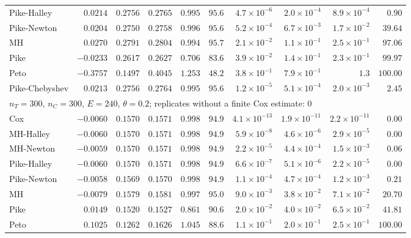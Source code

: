 \begin{landscape}
\begin{longtable}{lrrrrrrrrr}
Pike-Halley & $0.0214$ & $0.2756$ & $0.2765$ & $0.995$ & $95.6$ & $4.7 \times 10^{-6}$ & $2.0 \times 10^{-4}$ & $8.9 \times 10^{-4}$ & $0.90$ \\
Pike-Newton & $0.0204$ & $0.2750$ & $0.2758$ & $0.996$ & $95.6$ & $5.2 \times 10^{-4}$ & $6.7 \times 10^{-3}$ & $1.7 \times 10^{-2}$ & $39.64$ \\
MH & $0.0270$ & $0.2791$ & $0.2804$ & $0.994$ & $95.7$ & $2.1 \times 10^{-2}$ & $1.1 \times 10^{-1}$ & $2.5 \times 10^{-1}$ & $97.06$ \\
Pike & $-0.0233$ & $0.2617$ & $0.2627$ & $0.706$ & $83.6$ & $3.9 \times 10^{-2}$ & $1.4 \times 10^{-1}$ & $2.3 \times 10^{-1}$ & $99.97$ \\
Peto & $-0.3757$ & $0.1497$ & $0.4045$ & $1.253$ & $48.2$ & $3.8 \times 10^{-1}$ & $7.9 \times 10^{-1}$ & $1.3$ & $100.00$ \\
Pike-Chebyshev & $0.0213$ & $0.2756$ & $0.2764$ & $0.995$ & $95.6$ & $1.2 \times 10^{-5}$ & $5.1 \times 10^{-4}$ & $2.0 \times 10^{-3}$ & $2.45$ \\
\multicolumn{10}{l}{$n_T = 300$, $n_C = 300$, $E = 240$, $\theta = 0.2$; replicates without a finite Cox estimate: 0} \\
Cox & $-0.0060$ & $0.1570$ & $0.1571$ & $0.998$ & $94.9$ & $4.1 \times 10^{-13}$ & $1.9 \times 10^{-11}$ & $2.2 \times 10^{-11}$ & $0.00$ \\
MH-Halley & $-0.0060$ & $0.1570$ & $0.1571$ & $0.998$ & $94.9$ & $5.9 \times 10^{-8}$ & $4.6 \times 10^{-6}$ & $2.9 \times 10^{-5}$ & $0.00$ \\
MH-Newton & $-0.0059$ & $0.1570$ & $0.1571$ & $0.998$ & $94.9$ & $2.2 \times 10^{-5}$ & $4.4 \times 10^{-4}$ & $1.5 \times 10^{-3}$ & $0.06$ \\
Pike-Halley & $-0.0060$ & $0.1570$ & $0.1571$ & $0.998$ & $94.9$ & $6.6 \times 10^{-7}$ & $5.1 \times 10^{-6}$ & $2.2 \times 10^{-5}$ & $0.00$ \\
Pike-Newton & $-0.0058$ & $0.1569$ & $0.1570$ & $0.998$ & $94.9$ & $1.1 \times 10^{-4}$ & $4.7 \times 10^{-4}$ & $1.2 \times 10^{-3}$ & $0.21$ \\
MH & $-0.0079$ & $0.1579$ & $0.1581$ & $0.997$ & $95.0$ & $9.0 \times 10^{-3}$ & $3.8 \times 10^{-2}$ & $7.1 \times 10^{-2}$ & $20.70$ \\
Pike & $0.0149$ & $0.1520$ & $0.1527$ & $0.861$ & $90.6$ & $2.0 \times 10^{-2}$ & $4.0 \times 10^{-2}$ & $6.5 \times 10^{-2}$ & $41.81$ \\
Peto & $0.1025$ & $0.1262$ & $0.1626$ & $1.045$ & $88.6$ & $1.1 \times 10^{-1}$ & $2.0 \times 10^{-1}$ & $2.5 \times 10^{-1}$ & $100.00$ \\

\end{longtable}
\end{landscape}
